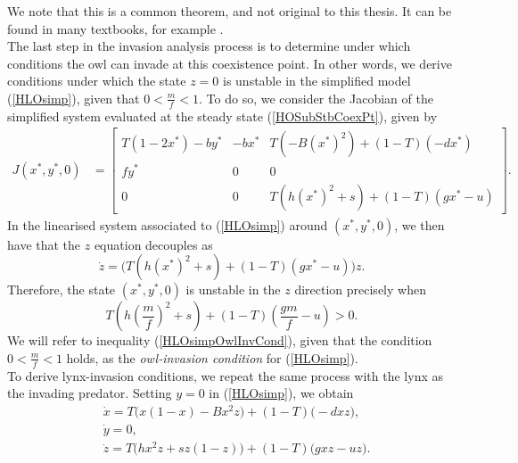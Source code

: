 \documentclass[12pt]{UOthesis}
\theoremstyle{remarkstyle}
\begin{document}
We note that this is a common theorem, and not original to this thesis. It can be found in many textbooks, for example \cite{Kot}.\\

The last step in the invasion analysis process is to determine under which conditions the owl can invade at this coexistence point. In other words, we derive conditions under which the state $z=0$ is unstable in the simplified model (\ref{HLOsimp}), given that $0<\frac{m}{f}<1$. To do so, we consider the Jacobian of the simplified system evaluated at the steady state (\ref{HOSubStbCoexPt}), given by
\begin{equation*}
	\begin{split}
		J(x^*,y^*,0)&=\begin{bmatrix}
				T\left(1-2x^*\right)-by^* & -bx^* & T\left(-B(x^*)^2\right)+(1-T)\left(-dx^*\right)\\
				fy^* & 0 & 0\\
				0 & 0 & T\left(h(x^*)^2+s\right)+(1-T)(gx^*-u)
		\end{bmatrix}.
	\end{split}
\end{equation*}
In the linearised system associated to (\ref{HLOsimp}) around $(x^*,y^*,0)$, we then have that the $z$ equation decouples as
$$\dot{z}=\Big(T\left(h(x^*)^2+s\right)+(1-T)(gx^*-u)\Big)z.$$
Therefore, the state $\left(x^*,y^*,0\right)$ is unstable in the $z$ direction precisely when
\begin{equation}
	T\left(h\left(\frac{m}{f}\right)^2+s\right)+(1-T)\left(\frac{gm}{f}-u\right)>0.
	\label{HLOsimpOwlInvCond}
\end{equation}
We will refer to inequality (\ref{HLOsimpOwlInvCond}), given that the condition $0<\frac{m}{f}<1$ holds, as the \textit{owl-invasion condition} for (\ref{HLOsimp}).\\

To derive lynx-invasion conditions, we repeat the same process with the lynx as the invading predator. Setting $y=0$ in (\ref{HLOsimp}), we obtain
\begin{equation}
	\begin{split}
		&\dot{x}=T\Big(x(1-x)-B x^2z\Big)+(1-T)\Big(-d xz\Big),\\
		&\dot{y}=0,\\
		&\dot{z}=T\Big(hx^2z+sz(1-z)\Big)+(1-T)\Big(gxz-uz\Big).
	\end{split}
	\label{HLOsimpy=0}
\end{equation}
\end{document}
